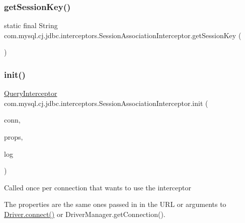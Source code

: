 \subsubsection{\texorpdfstring{get\+Session\+Key()}{getSessionKey()}}
{\footnotesize\ttfamily static final String com.\+mysql.\+cj.\+jdbc.\+interceptors.\+Session\+Association\+Interceptor.\+get\+Session\+Key (\begin{DoxyParamCaption}{ }\end{DoxyParamCaption})\hspace{0.3cm}{\ttfamily [static]}}

\mbox{\label{classcom_1_1mysql_1_1cj_1_1jdbc_1_1interceptors_1_1_session_association_interceptor_af6940dabb40c900b336fb6f5761160b6}} 
\subsubsection{\texorpdfstring{init()}{init()}}
{\footnotesize\ttfamily \mbox{\hyperlink{interfacecom_1_1mysql_1_1cj_1_1interceptors_1_1_query_interceptor}{Query\+Interceptor}} com.\+mysql.\+cj.\+jdbc.\+interceptors.\+Session\+Association\+Interceptor.\+init (\begin{DoxyParamCaption}\item[{\mbox{\hyperlink{interfacecom_1_1mysql_1_1cj_1_1_mysql_connection}{Mysql\+Connection}}}]{conn,  }\item[{Properties}]{props,  }\item[{\mbox{\hyperlink{interfacecom_1_1mysql_1_1cj_1_1log_1_1_log}{Log}}}]{log }\end{DoxyParamCaption})}

Called once per connection that wants to use the interceptor

The properties are the same ones passed in in the U\+RL or arguments to \mbox{\hyperlink{classcom_1_1mysql_1_1cj_1_1jdbc_1_1_non_registering_driver_ab3fd3d522550db032eab6c240b554e3e}{Driver.\+connect()}} or Driver\+Manager.\+get\+Connection().


